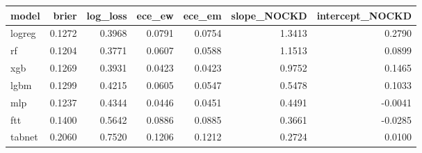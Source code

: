 \begin{tabular}{lrrrrrr}
\toprule
model & brier & log\_loss & ece\_ew & ece\_em & slope\_NOCKD & intercept\_NOCKD \\
\midrule
logreg & 0.1272 & 0.3968 & 0.0791 & 0.0754 & 1.3413 & 0.2790 \\
rf & 0.1204 & 0.3771 & 0.0607 & 0.0588 & 1.1513 & 0.0899 \\
xgb & 0.1269 & 0.3931 & 0.0423 & 0.0423 & 0.9752 & 0.1465 \\
lgbm & 0.1299 & 0.4215 & 0.0605 & 0.0547 & 0.5478 & 0.1033 \\
mlp & 0.1237 & 0.4344 & 0.0446 & 0.0451 & 0.4491 & -0.0041 \\
ftt & 0.1400 & 0.5642 & 0.0886 & 0.0885 & 0.3661 & -0.0285 \\
tabnet & 0.2060 & 0.7520 & 0.1206 & 0.1212 & 0.2724 & 0.0100 \\
\bottomrule
\end{tabular}
